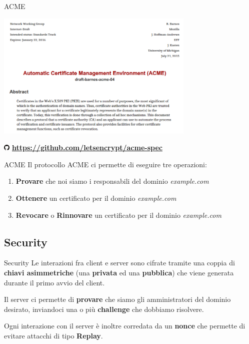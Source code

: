 \documentclass[xcolor=svgnames,11pt]{beamer}
\begin{document}
\begin{frame}{ACME}
\begin{center}
\includegraphics[width=9.5cm]{img/acme_spec.png}

\includegraphics[width=0.3cm]{img/logo_gh.pdf} \textbf{ \url{https://github.com/letsencrypt/acme-spec}}
\end{center}
\end{frame}


\begin{frame}{ACME}
Il protocollo ACME ci permette di eseguire tre operazioni:
\pause\medskip
\begin{enumerate}
  \item \textbf{Provare} che noi siamo i responsabili del dominio \emph{example.com}
  \pause\medskip
  \item \textbf{Ottenere} un certificato per il dominio \emph{example.com}
  \pause\medskip
  \item \textbf{Revocare} o \textbf{Rinnovare} un certificato per il dominio \emph{example.com}
\end{enumerate}
\end{frame}

\subsection{Security}
\begin{frame}{Security}
Le interazioni fra client e server sono cifrate tramite una coppia di \textbf{chiavi asimmetriche}
(una \textbf{privata} ed una \textbf{pubblica}) che viene generata durante il primo avvio del client.

\medskip \pause

\begin{block}{}
Il server ci permette di \textbf{provare} che siamo gli amministratori del dominio desirato, inviandoci
una o più \textbf{challenge} che dobbiamo risolvere.
\end{block}

\medskip \pause

Ogni interazione con il server è inoltre corredata da un \textbf{nonce} che permette di evitare attacchi
di tipo \textbf{Replay}.

\end{frame}
\end{document}
